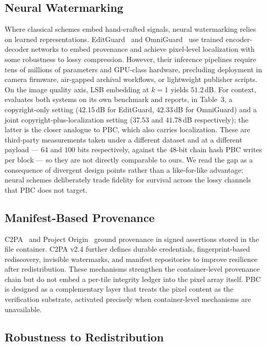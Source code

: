 \documentclass[conference]{IEEEtran}
\begin{document}
\subsection{Neural Watermarking}

Where classical schemes embed hand-crafted signals, neural watermarking
relies on learned representations.
EditGuard~\cite{editguard} and OmniGuard~\cite{omniguard} use trained
encoder-decoder networks to embed provenance and achieve pixel-level
localization with some robustness to lossy compression. However, their
inference pipelines require tens of millions of parameters and GPU-class
hardware, precluding deployment in camera firmware, air-gapped archival
workflows, or lightweight publisher scripts. On the image quality axis, LSB embedding at $k{=}1$ yields $51.2$\,dB. For context, \cite{omniguard} evaluates both systems on its own benchmark and reports, in Table~3, a copyright-only setting ($42.15$\,dB for EditGuard, $42.33$\,dB for OmniGuard) and a joint copyright-plus-localization setting ($37.53$ and $41.78$\,dB respectively); the latter is the closer analogue to PBC, which also carries localization. These are third-party measurements taken under a different dataset and at a different payload --- $64$ and $100$ bits respectively, against the $48$-bit chain hash PBC writes per block --- so they are not directly comparable to ours. We read the gap as a consequence of divergent design points rather than a like-for-like advantage: neural schemes deliberately trade fidelity for survival across the lossy channels that PBC does not target.

\subsection{Manifest-Based Provenance}

C2PA~\cite{c2pa_spec} and Project Origin~\cite{aythora2020origin}
ground provenance in signed assertions stored in the file container.
C2PA v2.4 further defines durable credentials, fingerprint-based
rediscovery, invisible watermarks, and manifest repositories to improve
resilience after redistribution. These mechanisms strengthen the
container-level provenance chain but do not embed a per-tile integrity
ledger into the pixel array itself. PBC is designed as a complementary
layer that treats the pixel content as the verification substrate,
activated precisely when container-level mechanisms are unavailable.

\subsection{Robustness to Redistribution}
\end{document}
